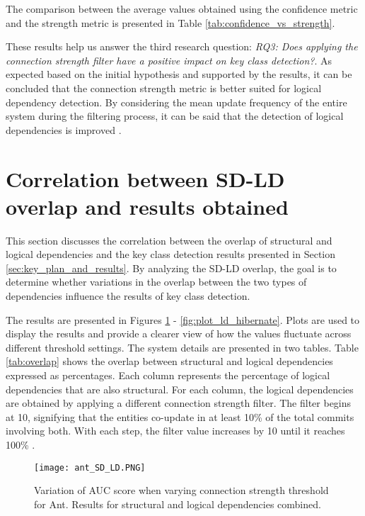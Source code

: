 The comparison between the average values obtained using the confidence metric and the strength metric is presented in Table \ref{tab:confidence_vs_strength}. 

These results help us answer the third research question: \textit{RQ3: Does applying the connection strength filter have a positive impact on key class detection?}. As expected based on the initial hypothesis and supported by the results, it can be concluded that the connection strength metric is better suited for logical dependency detection. By considering the mean update frequency of the entire system during the filtering process, it can be said that the detection of logical dependencies is improved \cite{b4}.





\section{Correlation between SD-LD overlap and results obtained}
\label{sec:key_overlapping}

\hspace{4em}This section discusses the correlation between the overlap of structural and logical dependencies and the key class detection results presented in Section \ref{sec:key_plan_and_results}. By analyzing the SD-LD overlap, the goal is to determine whether variations in the overlap between the two types of dependencies influence the results of key class detection.

The results are presented in Figures \ref{fig:plot_sd_ld_ant} - \ref{fig:plot_ld_hibernate}. Plots are used to display the results and provide a clearer view of how the values fluctuate across different threshold settings. The system details are presented in two tables. Table \ref{tab:overlap} shows the overlap between structural and logical dependencies expressed as percentages. Each column represents the percentage of logical dependencies that are also structural. For each column, the logical dependencies are obtained by applying a different connection strength filter. The filter begins at 10, signifying that the entities co-update in at least 10\% of the total commits involving both. With each step, the filter value increases by 10 until it reaches 100\% \cite{b4}.




\begin{figure}
\centering
\texttt{[image: ant\_SD\_LD.PNG]}
\caption{Variation of AUC score when varying connection strength threshold for Ant. Results for structural and logical dependencies combined. }
\label{fig:plot_sd_ld_ant}
\centering
\end{figure}


